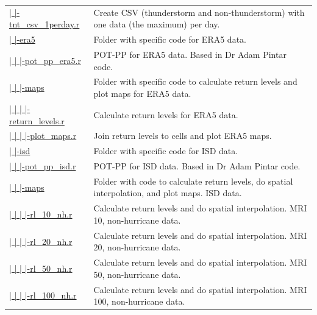 \documentclass[12pt,oneside]{reedthesis}
\begin{document}
\begin{longtable}[t]{>{\raggedright\arraybackslash}p{1.3in}>{\raggedright\arraybackslash}p{4.9in}}
\href{ftp://ftp.geocorp.co/windthesis/code/pot_pp/write_t_nt_csv_one_data_per_day.r}{  |    |-tnt\_csv\_1perday.r} & Create CSV (thunderstorm and non-thunderstorm) with one data (the maximum) per day.\\
\href{ftp://ftp.geocorp.co/windthesis/code/pot_pp/era5/}{  |    |-era5} & Folder with specific code for ERA5 data.\\
\href{ftp://ftp.geocorp.co/windthesis/code/pot_pp/era5/pot_pp_era5.r}{  |    |    |-pot\_pp\_era5.r} & POT-PP for ERA5 data. Based in Dr Adam Pintar code.\\
\href{ftp://ftp.geocorp.co/windthesis/code/pot_pp/era5/maps/}{  |    |    |-maps} & Folder with specific code to calculate return levels and plot maps for ERA5 data.\\
\href{ftp://ftp.geocorp.co/windthesis/code/pot_pp/era5/maps/return_levels.r}{  |    |    |    |-return\_levels.r} & Calculate return levels for ERA5 data.\\
\href{ftp://ftp.geocorp.co/windthesis/code/pot_pp/era5/maps/plot_maps.r}{  |    |    |    |-plot\_maps.r} & Join return levels to cells and plot ERA5 maps.\\
\href{ftp://ftp.geocorp.co/windthesis/code/pot_pp/isd/}{  |    |-isd} & Folder with specific code for ISD data.\\
\href{ftp://ftp.geocorp.co/windthesis/code/pot_pp/isd/pot_pp_isd.r}{  |    |    |-pot\_pp\_isd.r} & POT-PP for ISD data. Based in Dr Adam Pintar code.\\
\href{ftp://ftp.geocorp.co/windthesis/code/pot_pp/isd/maps/}{  |    |    |-maps} & Folder with code to calculate return levels, do spatial interpolation, and plot maps. ISD data.\\
\href{ftp://ftp.geocorp.co/windthesis/code/pot_pp/isd/maps/return_levels_10_nh.r}{  |    |    |    |-rl\_10\_nh.r} & Calculate return levels and do spatial interpolation. MRI 10, non-hurricane data.\\
\href{ftp://ftp.geocorp.co/windthesis/code/pot_pp/isd/maps/return_levels_20_nh.r}{  |    |    |    |-rl\_20\_nh.r} & Calculate return levels and do spatial interpolation. MRI 20, non-hurricane data.\\
\href{ftp://ftp.geocorp.co/windthesis/code/pot_pp/isd/maps/return_levels_50_nh.r}{  |    |    |    |-rl\_50\_nh.r} & Calculate return levels and do spatial interpolation. MRI 50, non-hurricane data.\\
\href{ftp://ftp.geocorp.co/windthesis/code/pot_pp/isd/maps/return_levels_100_nh.r}{  |    |    |    |-rl\_100\_nh.r} & Calculate return levels and do spatial interpolation. MRI 100, non-hurricane data.\\

\end{longtable}
\end{document}

